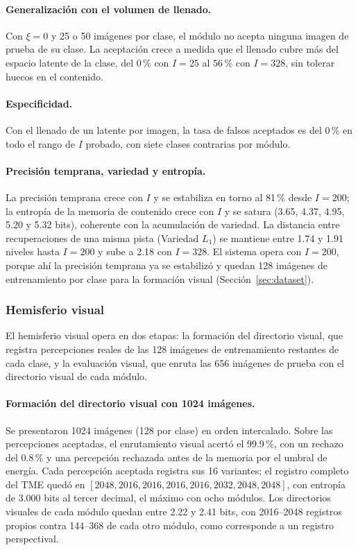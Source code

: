 \paragraph{Generalización con el volumen de llenado.}
Con $\xi = 0$ y 25 o 50 imágenes por clase, el módulo no acepta ninguna imagen de prueba
de su clase.
La aceptación crece a medida que el llenado cubre más del espacio latente de la clase,
del 0\,\% con $I = 25$ al 56\,\% con $I = 328$, sin tolerar huecos en el contenido.

\paragraph{Especificidad.}
Con el llenado de un latente por imagen, la tasa de falsos aceptados es del 0\,\% en todo
el rango de $I$ probado, con siete clases contrarias por módulo.

\paragraph{Precisión temprana, variedad y entropía.}
La precisión temprana crece con $I$ y se estabiliza en torno al 81\,\% desde $I = 200$; la
entropía de la memoria de contenido crece con $I$ y se satura (3.65, 4.37, 4.95, 5.20 y
5.32 bits), coherente con la acumulación de variedad.
La distancia entre recuperaciones de una misma pista (Variedad $L_1$) se mantiene entre
1.74 y 1.91 niveles hasta $I = 200$ y sube a 2.18 con $I = 328$.
El sistema opera con $I = 200$, porque ahí la precisión temprana ya se estabilizó y
quedan 128 imágenes de entrenamiento por clase para la formación visual
(Sección~\ref{sec:dataset}).

\subsubsection{Hemisferio visual}
\label{sec:hemisferio-visual}

El hemisferio visual opera en dos etapas: la formación del directorio visual, que
registra percepciones reales de las 128 imágenes de entrenamiento restantes de cada
clase, y la evaluación visual, que enruta las 656 imágenes de prueba con el directorio
visual de cada módulo.

\paragraph{Formación del directorio visual con 1024 imágenes.}
Se presentaron 1024 imágenes (128 por clase) en orden intercalado.
Sobre las percepciones aceptadas, el enrutamiento visual acertó el 99.9\,\%, con un
rechazo del 0.8\,\% y una percepción rechazada antes de la memoria por el umbral de
energía.
Cada percepción aceptada registra sus 16 variantes; el registro completo del TME quedó
en $[2048, 2016, 2016, 2016, 2016, 2032, 2048, 2048]$, con entropía de 3.000 bits al
tercer decimal, el máximo con ocho módulos.
Los directorios visuales de cada módulo quedan entre 2.22 y 2.41 bits, con 2016--2048
registros propios contra 144--368 de cada otro módulo, como corresponde a un registro
perspectival.


